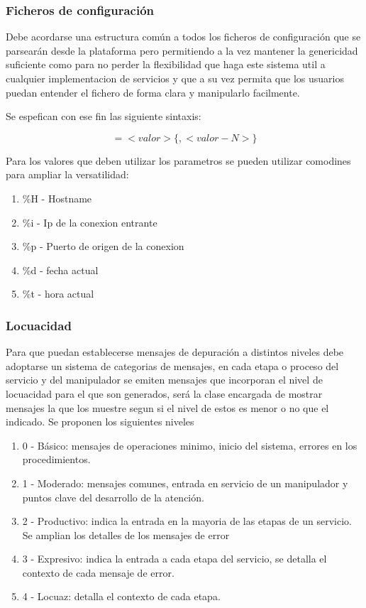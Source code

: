 \documentclass[a4paper,spanish,12pt]{book}
\begin{document}
\subsubsection{Ficheros de configuración}
Debe acordarse una estructura común a todos los ficheros de configuración que se parsearán desde la plataforma pero permitiendo a la vez mantener la genericidad suficiente como para no perder la flexibilidad que haga este sistema util a cualquier implementacion de servicios y que a su vez permita que los usuarios puedan entender el fichero de forma clara y manipularlo facilmente.

Se espefican con ese fin las siguiente sintaxis:


\[<nombre parametro>=<valor>\{,<valor-N>\}\]


Para los valores que deben utilizar los parametros se pueden utilizar comodines para ampliar la versatilidad:
\begin{enumerate}
	\item \%H - Hostname
	\item \%i - Ip de la conexion entrante
	\item \%p - Puerto de origen de la conexion
	\item \%d - fecha actual
	\item \%t - hora actual
\end{enumerate}

\subsubsection{Locuacidad}
Para que puedan establecerse mensajes de depuración a distintos niveles debe adoptarse un sistema de categorias de mensajes, en cada etapa o proceso del servicio y del manipulador se emiten mensajes que incorporan el nivel de locuacidad para el que son generados, será la clase encargada de mostrar mensajes la que los muestre segun si el nivel de estos es menor o no que el indicado.
Se proponen los siguientes niveles
\begin{enumerate}
	\item 0 - Básico: mensajes de operaciones minimo, inicio del sistema, errores en los procedimientos.
	\item 1 - Moderado: mensajes comunes, entrada en servicio de un manipulador y puntos clave del desarrollo de la atención.
	\item 2 - Productivo: indica la entrada en la mayoria de las etapas de un servicio. Se amplian los detalles de los mensajes de error
	\item 3 - Expresivo: indica la entrada a cada etapa del servicio, se detalla el contexto de cada mensaje de error.
	\item 4 - Locuaz: detalla el contexto de cada etapa.
\end{enumerate}
\end{document}
